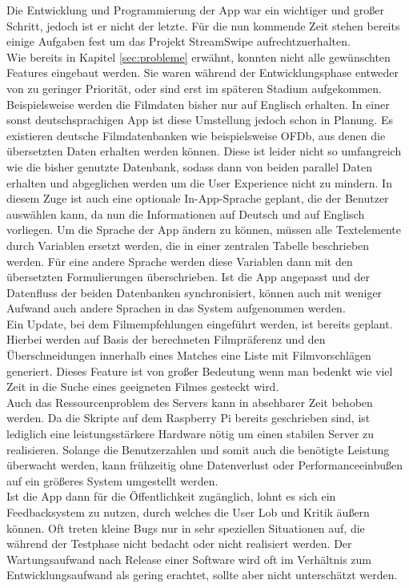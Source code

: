 Die Entwicklung und Programmierung der App war ein wichtiger und großer Schritt, jedoch ist er nicht der letzte. Für die nun kommende Zeit stehen bereits einige Aufgaben fest um das Projekt StreamSwipe aufrechtzuerhalten.\\
Wie bereits in Kapitel \ref{sec:probleme} erwähnt, konnten nicht alle gewünschten Features eingebaut werden. Sie waren während der Entwicklungsphase entweder von zu geringer Priorität, oder sind erst im späteren Stadium aufgekommen. Beispielsweise werden die Filmdaten bisher nur auf Englisch erhalten. In einer sonst deutschsprachigen App ist diese Umstellung jedoch schon in Planung. Es existieren deutsche Filmdatenbanken wie beispielsweise OFDb, aus denen die übersetzten Daten erhalten werden können. Diese ist leider nicht so umfangreich wie die bisher genutzte Datenbank, sodass dann von beiden parallel Daten erhalten und abgeglichen werden um die User Experience nicht zu mindern.  In diesem Zuge ist auch eine optionale In-App-Sprache geplant, die der Benutzer auswählen kann, da nun die Informationen auf Deutsch und auf Englisch vorliegen. Um die Sprache der App ändern zu können, müssen alle Textelemente durch Variablen ersetzt werden, die in einer zentralen Tabelle beschrieben werden. Für eine andere Sprache werden diese Variablen dann mit den übersetzten Formulierungen überschrieben. Ist die App angepasst und der Datenfluss der beiden Datenbanken synchronisiert, können auch mit weniger Aufwand auch andere Sprachen in das System aufgenommen werden.\\
Ein Update, bei dem Filmempfehlungen eingeführt werden, ist bereits geplant. Hierbei werden auf Basis der berechneten Filmpräferenz und den Überschneidungen innerhalb eines Matches eine Liste mit Filmvorschlägen generiert. Dieses Feature ist von großer Bedeutung wenn man bedenkt wie viel Zeit in die Suche eines geeigneten Filmes gesteckt wird.\\
Auch das Ressourcenproblem des Servers kann in absehbarer Zeit behoben werden. Da die Skripte auf dem Raspberry Pi bereits geschrieben sind, ist lediglich eine leistungsstärkere Hardware nötig um einen stabilen Server zu realisieren. Solange die Benutzerzahlen und somit auch die benötigte Leistung überwacht werden, kann frühzeitig ohne Datenverlust oder Performanceeinbußen auf ein größeres System umgestellt werden.\\
Ist die App dann für die Öffentlichkeit zugänglich, lohnt es sich ein Feedbacksystem zu nutzen, durch welches die User Lob und Kritik äußern können. Oft treten kleine Bugs nur in sehr speziellen Situationen auf, die während der Testphase nicht bedacht oder nicht realisiert werden. Der Wartungsaufwand nach Release einer Software wird oft im Verhältnis zum Entwicklungsaufwand als gering erachtet, sollte aber nicht unterschätzt werden. 
